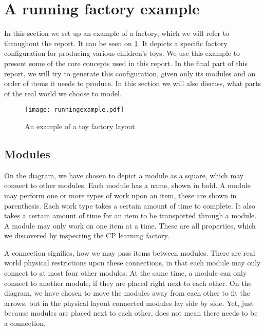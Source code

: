 \section{A running factory example}\label{sec:runningexample}
In this section we set up an example of a factory, which we will refer to throughout the report. It can be seen on \cref{fig:running-example}. It depicts a specific factory configuration for producing various children's toys. We use this example to present some of the core concepts used in this report. In the final part of this report, we will try to generate this configuration, given only its modules and an order of items it needs to produce. In this section we will also discuss, what parts of the real world we choose to model.

\begin{figure}[h]
\centering
\texttt{[image: runningexample.pdf]}
\caption{An example of a toy factory layout}
\label{fig:running-example}
\end{figure}

\subsection{Modules}
On the diagram, we have chosen to depict a module as a square, which may connect to other modules. Each module has a name, shown in bold. A module may perform one or more types of work upon an item, these are shown in parenthesis. Each work type takes a certain amount of time to complete. It also takes a certain amount of time for an item to be transported through a module. A module may only work on one item at a time. These are all properties, which we discovered by inspecting the CP learning factory.

A connection signifies, how we may pass items between modules. There are real world physical restrictions upon these connections, in that each module may only connect to at most four other modules. At the same time, a module can only connect to another module, if they are placed right next to each other. On the diagram, we have chosen to move the modules away from each other to fit the arrows, but in the physical layout connected modules lay side by side. Yet, just because modules are placed next to each other, does not mean there needs to be a connection. 

